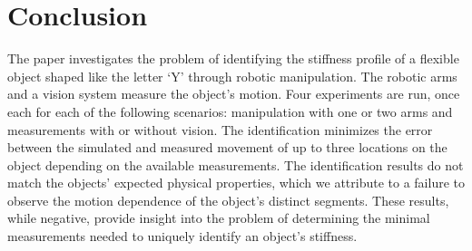 \documentclass[runningheads,a4paper]{llncs}
\begin{document}


\section{Conclusion}
\label{sec-conc}
The paper investigates the problem of identifying the stiffness profile of a flexible object shaped like the letter `Y' through robotic manipulation. The robotic arms and a vision system measure the object's motion. Four experiments are run, once each for each of the following scenarios: manipulation with one or two arms and measurements with or without vision. The identification minimizes the error between the simulated and measured movement of up to three locations on the object depending on the available measurements. The identification results do not match the objects' expected physical properties, which we attribute to a failure to observe the motion dependence of the object's distinct segments. These results, while negative, provide insight into the problem of determining the minimal measurements needed to uniquely identify an object's stiffness.




\end{document}
